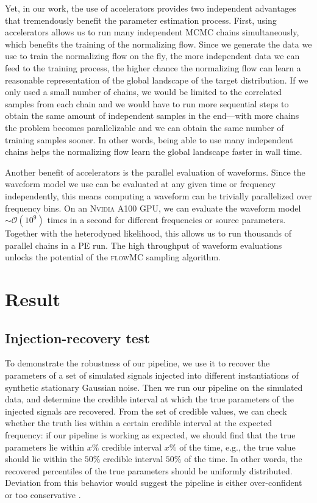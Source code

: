 \documentclass[twocolumn]{aastex631}
\begin{document}
Yet, in our work, the use of accelerators provides two independent advantages
that tremendously benefit the parameter estimation process. First, using
accelerators allows us to run many independent MCMC chains simultaneously,
which benefits the training of the normalizing flow. Since we generate the data
we use to train the normalizing flow on the fly, the more independent data we
can feed to the training process, the higher chance the normalizing flow can
learn a reasonable representation of the global landscape of the target
distribution.  If we only used a small number of chains, we would be limited to
the correlated samples from each chain and we would have to run more sequential
steps to obtain the same amount of independent samples in the end---with more
chains the problem becomes parallelizable and we can obtain the same number of
training samples sooner. In other words, being able to use many independent
chains helps the normalizing flow learn the global landscape faster in wall
time.

Another benefit of accelerators is the parallel evaluation of waveforms. Since
the waveform model we use can be evaluated at any given time or frequency
independently, this means computing a waveform can be trivially parallelized
over frequency bins. On an \textsc{Nvidia} A100 GPU, we can evaluate the
waveform model $\sim \mathcal{O}(10^9)$ times in a second for different
frequencies or source parameters. Together with the heterodyned likelihood, this
allows us to run thousands of parallel chains in a PE run. The high throughput
of waveform evaluations unlocks the potential of the \textsc{flowMC} sampling
algorithm.

\section{Result}
\label{sec: Result}
\subsection{Injection-recovery test}

To demonstrate the robustness of our pipeline, we use it to recover the
parameters of a set of simulated signals injected into different instantiations
of synthetic stationary Gaussian noise. Then we run our pipeline on the
simulated data, and determine the credible interval at which the true
parameters of the injected signals are recovered. From the set of credible
values, we can check whether the truth lies within a certain credible interval
at the expected frequency: if our pipeline is working as expected, we should
find that the true parameters lie within $x\%$ credible interval $x\%$ of the
time, e.g., the true value should lie within the $50\%$ credible interval
$50\%$ of the time. In other words, the recovered percentiles of the true
parameters should be uniformly distributed. Deviation from this behavior would
suggest the pipeline is either over-confident or too conservative
\cite{Cook2006,Talts2018}.
\end{document}
